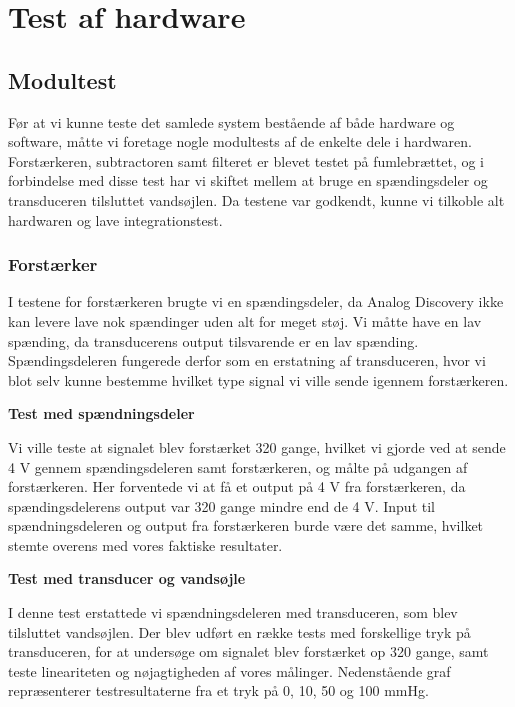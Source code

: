 \section{Test af hardware}
\subsection{Modultest}
Før at vi kunne teste det samlede system bestående af både hardware og software, måtte vi foretage nogle modultests af de enkelte dele i hardwaren. Forstærkeren, subtractoren samt filteret er blevet testet på fumlebrættet, og i forbindelse med disse test har vi skiftet mellem at bruge en spændingsdeler og transduceren tilsluttet vandsøjlen. Da testene var godkendt, kunne vi tilkoble alt hardwaren og lave integrationstest.

\subsubsection{Forstærker}
I testene for forstærkeren brugte vi en spændingsdeler, da Analog Discovery ikke kan levere
lave nok spændinger uden alt for meget støj. Vi måtte have en lav spænding, da transducerens
output tilsvarende er en lav spænding. Spændingsdeleren fungerede derfor som en erstatning
af transduceren, hvor vi blot selv kunne bestemme hvilket type signal vi ville sende igennem
forstærkeren.

\textbf{Test med spændningsdeler}

Vi ville teste at signalet blev forstærket 320 gange, hvilket vi gjorde ved at sende 4 V gennem spændingsdeleren samt forstærkeren, og målte på udgangen af forstærkeren. Her forventede vi at få et output på 4 V fra forstærkeren, da spændingsdelerens output var 320 gange mindre end de 4 V. Input til spændningsdeleren og output fra forstærkeren burde være det samme, hvilket stemte overens med vores faktiske resultater.

\textbf{Test med transducer og vandsøjle}

I denne test erstattede vi spændningsdeleren med transduceren, som blev tilsluttet vandsøjlen. Der blev udført en række tests med forskellige tryk på transduceren, for at undersøge om signalet blev forstærket op 320 gange, samt teste lineariteten og nøjagtigheden af vores målinger.
Nedenstående graf repræsenterer testresultaterne fra et tryk på 0, 10, 50 og 100 mmHg.

\vspace{0.5 cm}

